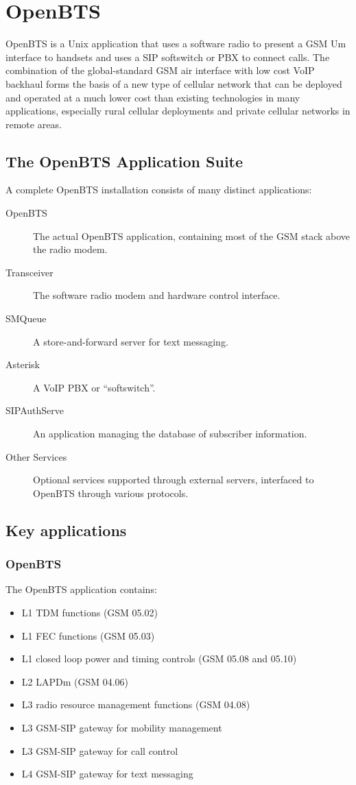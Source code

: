 \chapter{OpenBTS}

OpenBTS is a Unix application that uses a software radio to present a GSM Um interface 
to handsets and uses a SIP softswitch or PBX to connect calls.
The combination of the global-standard GSM air interface with low cost VoIP backhaul 
forms the basis of a new type of cellular network that can be deployed and operated at a much lower
cost than existing technologies in many applications, 
especially rural cellular deployments and private cellular networks in remote areas.

\section{The OpenBTS Application Suite}
A complete OpenBTS installation consists of many distinct applications:

\begin{description}
\item[OpenBTS] The actual OpenBTS application, containing most of the GSM stack above the radio modem.
\item[Transceiver] The software radio modem and hardware control interface.
\item[SMQueue] A store-and-forward server for text messaging.
\item[Asterisk] A VoIP PBX or ``softswitch''.
\item[SIPAuthServe] An application managing the database of subscriber information.
\item[Other Services] Optional services supported through external servers, interfaced to OpenBTS through
various protocols.
\end{description}

\section{Key applications}
\subsection{OpenBTS}
The OpenBTS application contains:
\begin{itemize}
\item L1 TDM functions (GSM 05.02)
\item L1 FEC functions (GSM 05.03)
\item L1 closed loop power and timing controls (GSM 05.08 and 05.10)
\item L2 LAPDm (GSM 04.06)
\item L3 radio resource management functions (GSM 04.08)
\item L3 GSM-SIP gateway for mobility management
\item L3 GSM-SIP gateway for call control
\item L4 GSM-SIP gateway for text messaging
\end{itemize}

